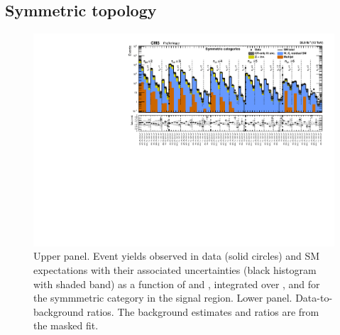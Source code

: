 \clearpage
\subsection{Symmetric topology}

\begin{figure}[h!]
  \centering
  \caption{Upper panel. Event yields observed in data (solid circles)
    and SM expectations with their associated uncertainties (black
    histogram with shaded band) as a function of \nb and \scalht,
    integrated over \mht, and for the symmmetric \njet category
    in the signal region. Lower panel. Data-to-background ratios. The
    background estimates and ratios are from the masked fit. }
  \label{fig:mr_symm_pre}
  \includegraphics[width=1.\linewidth]{figures/results/36invfb_freeze/symm/summaryPlot_Symmetric_prefit}
\end{figure}

